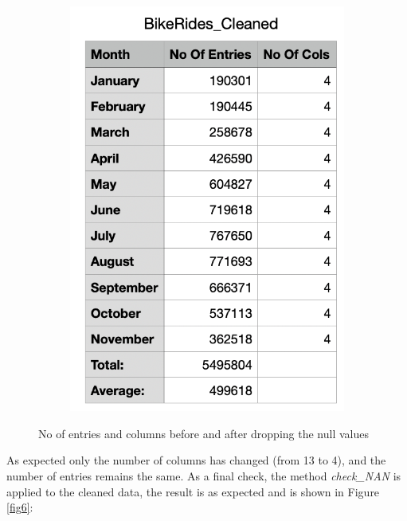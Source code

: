 \documentclass[12pt]{article}
\begin{document}
\begin{itemize}
\begin{figure}[h]
\begin{subfigure}{.4\textwidth}
		\includegraphics[scale=0.5]{img4.png}
	\end{subfigure}
	\caption{No of entries and columns before and after dropping the null values}
	\label{fig5}
	\end{figure}
	
	As expected only the number of columns has changed (from 13 to 4), and the number of entries remains the same. As a final check, the method \textit{check\_NAN} is applied to the cleaned data, the result is as expected and is shown in Figure \ref{fig6}:
	

\end{itemize}
\end{document}
